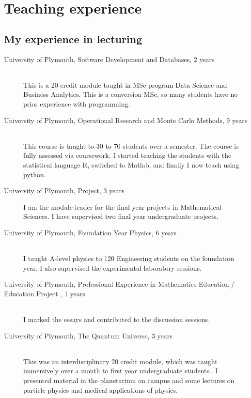 \documentclass[12pt]{article}
\begin{document}
\FloatBarrier

%
\section{Teaching experience}

\subsection{My experience in lecturing}


\begin{description}

 \item[University of Plymouth, 
Software Development and Databases,
2 years]\hfill \\ This is a 20 credit module taught in
MSc program Data Science and Business Analytics. This is a conversion
MSc, so many students have no prior experience with programming.

  \item[University of Plymouth, Operational Research and Monte Carlo Methods,
9 years] \hfill \\
This course is taught to  30 to 70 students over a semester. The course is fully
assessed via coursework. I started teaching the students with the statistical language R, switched 
to Matlab, and finally I now teach using python.

\item[University of Plymouth, Project, 3 years] I am the module leader
for the final year projects in Mathematical Sciences. I have
supervised two final year undergraduate projects.


  \item[University of Plymouth, Foundation Year Physics,
6 years] \hfill \\
I taught A-level physics to 120 Engineering students
on the foundation year. I also supervised the experimental 
laboratory sessions.

\item[University of Plymouth, Professional Experience in Mathematics
  Education / Education Project ,
1 years] \hfill \\
I marked the essays and contributed to the discussion sessions.

  \item[University of Plymouth, The Quantum Universe,
3 years] \hfill \\
This was an interdisciplinary 20 credit module, which was taught
immersively over a month to first year undergraduate students.. 
I presented material in the planetarium on campus and some lectures on
particle physics and medical applications of physics.


\end{description}
\end{document}
